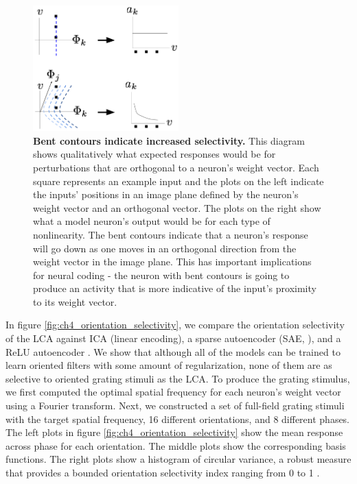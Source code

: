 \begin{figure}[h]
    \centering
    \includegraphics[width=0.5\textwidth]{figures/lca_selectivity_diagram.png}
    \caption{\textbf{Bent contours indicate increased selectivity.} This diagram shows qualitatively what expected responses would be for perturbations that are orthogonal to a neuron's weight vector. Each square represents an example input and the plots on the left indicate the inputs' positions in an image plane defined by the neuron's weight vector and an orthogonal vector. The plots on the right show what a model neuron's output would be for each type of nonlinearity. The bent contours indicate that a neuron's response will go down as one moves in an orthogonal direction from the weight vector in the image plane. This has important implications for neural coding - the neuron with bent contours is going to produce an activity that is more indicative of the input's proximity to its weight vector.}
    \label{fig:ch4_lca_selectivity_diagram}
\end{figure}

In figure \ref{fig:ch4_orientation_selectivity}, we compare the orientation selectivity of the LCA against ICA (linear encoding), a sparse autoencoder (SAE, \cite{ng2011sparse}), and a ReLU autoencoder \parencite{nair2010rectified}. We show that although all of the models can be trained to learn oriented filters with some amount of regularization, none of them are as selective to oriented grating stimuli as the LCA. To produce the grating stimulus, we first computed the optimal spatial frequency for each neuron's weight vector using a Fourier transform. Next, we constructed a set of full-field grating stimuli with the target spatial frequency, 16 different orientations, and 8 different phases. The left plots in figure \ref{fig:ch4_orientation_selectivity} show the mean response across phase for each orientation. The middle plots show the corresponding basis functions. The right plots show a histogram of circular variance, a robust measure that provides a bounded orientation selectivity index ranging from 0 to 1 \parencite{ringach2002orientation}.


